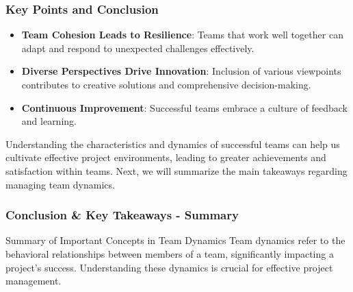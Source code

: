\documentclass[aspectratio=169]{beamer}
\begin{document}
\begin{frame}[fragile]
    \frametitle{Key Points and Conclusion}
    \begin{itemize}
        \item \textbf{Team Cohesion Leads to Resilience}: Teams that work well together can adapt and respond to unexpected challenges effectively.
        \item \textbf{Diverse Perspectives Drive Innovation}: Inclusion of various viewpoints contributes to creative solutions and comprehensive decision-making.
        \item \textbf{Continuous Improvement}: Successful teams embrace a culture of feedback and learning.
    \end{itemize}
    
    Understanding the characteristics and dynamics of successful teams can help us cultivate effective project environments, leading to greater achievements and satisfaction within teams. Next, we will summarize the main takeaways regarding managing team dynamics.
\end{frame}

\begin{frame}[fragile]
    \frametitle{Conclusion \& Key Takeaways - Summary}
    \begin{block}{Summary of Important Concepts in Team Dynamics}
        Team dynamics refer to the behavioral relationships between members of a team, significantly impacting a project’s success. Understanding these dynamics is crucial for effective project management.
    \end{block}
\end{frame}
\end{document}
